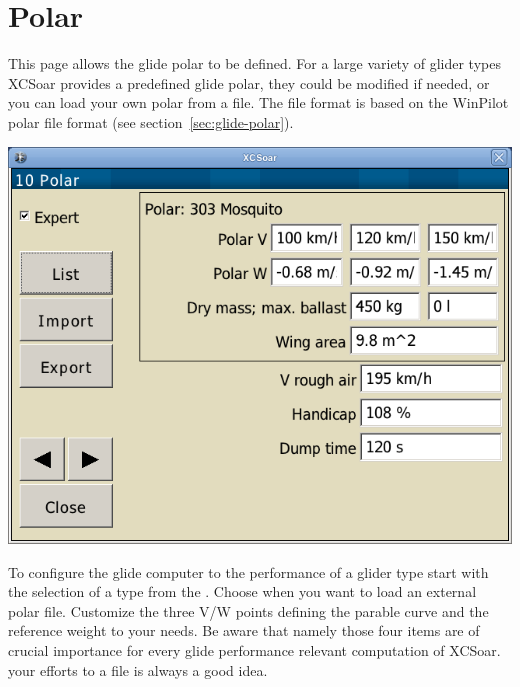 \clearpage
\section{Polar}

This page allows the glide polar to be defined. For a large variety of glider types 
XCSoar provides a predefined glide polar, they could be modified if needed, or 
you can load your own polar from a file. 
The file format is based on the WinPilot polar file format (see section~\ref{sec:glide-polar}).

\begin{center}
\includegraphics[angle=0,width=0.8\linewidth,keepaspectratio='true']{figures/config-polar.png}
\end{center}

\label{conf:polar} To configure the glide computer to the performance of a glider 
type start with the selection of a type from the . 
Choose  when you want to load an external polar file.
Customize the three V/W points defining the parable curve and the reference 
weight to your needs. 
\tip Be aware that namely those four items are of crucial importance 
for every glide performance relevant computation of XCSoar.   
 your efforts to a file is always a good idea.

